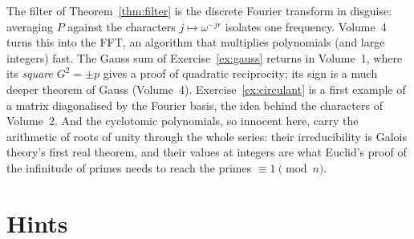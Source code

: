 \begin{beauty}
The filter of Theorem~\ref{thm:filter} is the discrete Fourier transform in disguise: averaging $P$ against the
characters $j\mapsto\omega^{-jr}$ isolates one frequency. Volume~4 turns this into the FFT, an algorithm that multiplies
polynomials (and large integers) fast. The Gauss sum of Exercise~\ref{ex:gauss} returns in Volume~1, where its
\emph{square} $G^2=\pm p$ gives a proof of quadratic reciprocity; its sign is a much deeper theorem of Gauss (Volume~4). Exercise~\ref{ex:circulant} is a first example of a matrix
diagonalised by the Fourier basis, the idea behind the characters of Volume~2. And the cyclotomic polynomials, so innocent here, carry the arithmetic of
roots of unity through the whole series: their irreducibility is Galois theory's first real theorem, and their values at integers are what Euclid's proof
of the infinitude of primes needs to reach the primes $\equiv1\pmod n$.
\end{beauty}

\section{Hints}

